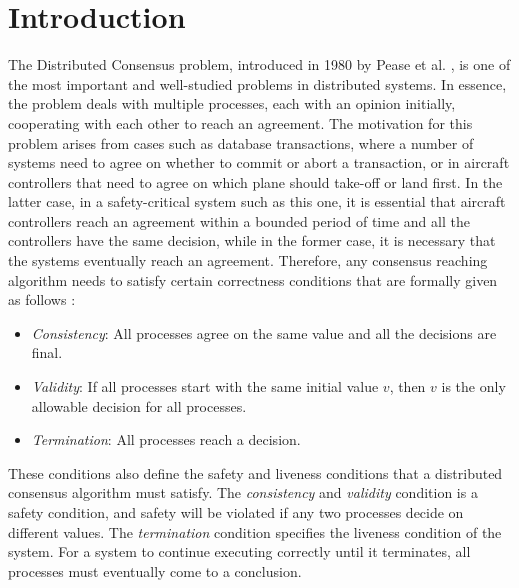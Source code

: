 ﻿\section{Introduction}

The Distributed Consensus problem, introduced in 1980 by Pease et al. \cite{PeaseSL80}, is one of the most important and well-studied problems in distributed systems. In essence, the problem deals with multiple processes, each with an opinion initially, cooperating with each other to reach an agreement. The motivation for this problem arises from cases such as database transactions, where a number of systems need to agree on whether to commit or abort a transaction, or in aircraft controllers that need to agree on which plane should take-off or land first. In the latter case, in a safety-critical system such as this one, it is essential that aircraft controllers reach an agreement within a bounded period of time and all the controllers have the same decision, while in the former case, it is necessary that the systems eventually reach an agreement. Therefore, any consensus reaching algorithm needs to satisfy certain correctness conditions that are formally given as follows \cite{PeaseSL80}:

\begin{itemize}
    \item \textit{Consistency}: All processes agree on the same value and all the decisions are final.
    \item \textit{Validity}: If all processes start with the same initial value $v$, then $v$ is the only allowable decision for all processes.
    \item \textit{Termination}: All processes reach a decision.
\end{itemize}


These conditions also define the safety and liveness conditions that a distributed consensus algorithm must satisfy.  The \textit{consistency} and \textit{validity} condition is a safety condition, and safety will be violated if any two processes decide on different values. The \textit{termination} condition specifies the liveness condition of the system. For a system to continue executing correctly until it terminates, all processes must eventually come to a conclusion.

